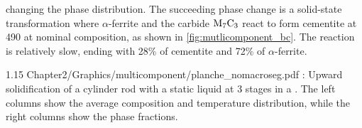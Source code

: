 changing the phase distribution. The succeeding phase change is a solid-state transformation where $\alpha$-ferrite and the carbide $\text{M}_7 \text{C}_3$ react to form 
cementite at \SI{490}{\udegC} at nominal composition, as shown in \cref{fig:mutlicomponent_bc}. The reaction is relatively slow, ending with 28\% 
of cementite and 72\% of $\alpha$-ferrite.
%
\begin{landscape}
\begin{figureth}
{1.15}
{Chapter2/Graphics/multicomponent/planche_nomacroseg.pdf}
{: Upward solidification of a cylinder rod with a static liquid at 
3 stages in a . The left columns show the average 
composition and temperature distribution, while the right columns show the phase fractions.}
\label{fig:planche_nomacroseg}
\end{figureth}
\end{landscape}
%